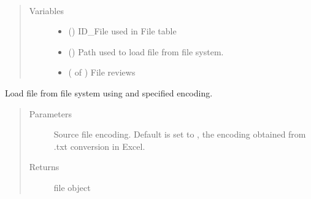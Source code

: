 \documentclass[letterpaper,10pt,english]{sphinxmanual}
\begin{document}
\begin{fulllineitems}
\label{\detokenize{index:loacore.classes.classes.File}}~\begin{quote}\begin{description}
\item[{Variables}] \leavevmode\begin{itemize}
\item {} 
 () \textendash{} ID\_File used in File table

\item {} 
 () \textendash{} Path used to load file from file system.

\item {} 
 ( of {\hyperref[\detokenize{index:loacore.classes.classes.Review}]{}}) \textendash{} File reviews

\end{itemize}

\end{description}\end{quote}

\begin{fulllineitems}
\label{\detokenize{index:loacore.classes.classes.File.load}}
Load file from file system using  and specified encoding.
\begin{quote}\begin{description}
\item[{Parameters}] \leavevmode
{} \textendash{} Source file encoding. Default is set to , the encoding obtained from .txt conversion in Excel.

\item[{Returns}] \leavevmode
file object

\end{description}\end{quote}

\end{fulllineitems}


\end{fulllineitems}
\end{document}
